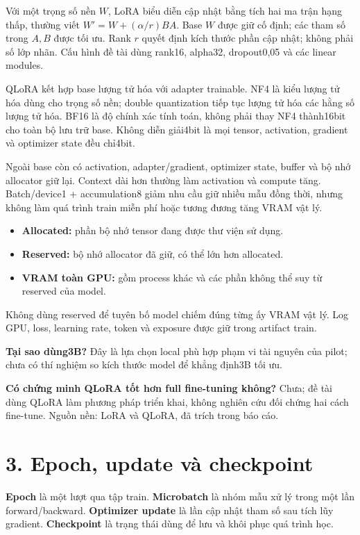 \documentclass[12pt,a4paper]{article}
\begin{document}
Với một trọng số nền \(W\), LoRA biểu diễn cập nhật bằng tích hai ma trận hạng thấp, thường viết \(W'=W+(\alpha/r)BA\). Base \(W\) được giữ cố định; các tham số trong \(A,B\) được tối ưu. Rank \(r\) quyết định kích thước phần cập nhật; không phải số lớp nhãn. Cấu hình đề tài dùng rank16, alpha32, dropout0,05 và các linear modules.

QLoRA kết hợp base lượng tử hóa với adapter trainable. NF4 là kiểu lượng tử hóa dùng cho trọng số nền; double quantization tiếp tục lượng tử hóa các hằng số lượng tử hóa. BF16 là độ chính xác tính toán, không phải thay NF4 thành16bit cho toàn bộ lưu trữ base. Không diễn giải4bit là mọi tensor, activation, gradient và optimizer state đều chỉ4bit.

Ngoài base còn có activation, adapter/gradient, optimizer state, buffer và bộ nhớ allocator giữ lại. Context dài hơn thường làm activation và compute tăng. Batch/device1 + accumulation8 giảm nhu cầu giữ nhiều mẫu đồng thời, nhưng không làm quá trình train miễn phí hoặc tương đương tăng VRAM vật lý.

\begin{itemize}
\item \textbf{Allocated:} phần bộ nhớ tensor đang được thư viện sử dụng.
\item \textbf{Reserved:} bộ nhớ allocator đã giữ, có thể lớn hơn allocated.
\item \textbf{VRAM toàn GPU:} gồm process khác và các phần không thể suy từ reserved của model.
\end{itemize}
Không dùng reserved để tuyên bố model chiếm đúng từng ấy VRAM vật lý. Log GPU, loss, learning rate, token và exposure được giữ trong artifact train.

\textbf{Tại sao dùng3B?} Đây là lựa chọn local phù hợp phạm vi tài nguyên của pilot; chưa có thí nghiệm so kích thước model để khẳng định3B tối ưu.\par
\textbf{Có chứng minh QLoRA tốt hơn full fine-tuning không?} Chưa; đề tài dùng QLoRA làm phương pháp triển khai, không nghiên cứu đối chứng hai cách fine-tune. Nguồn nền: LoRA và QLoRA, đã trích trong báo cáo.

\nextpage
\section*{3. Epoch, update và checkpoint}
\textbf{Epoch} là một lượt qua tập train. \textbf{Microbatch} là nhóm mẫu xử lý trong một lần forward/backward. \textbf{Optimizer update} là lần cập nhật tham số sau tích lũy gradient. \textbf{Checkpoint} là trạng thái dùng để lưu và khôi phục quá trình học.
\end{document}
